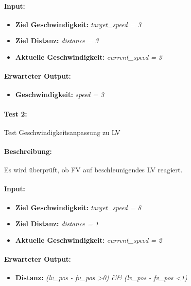 \documentclass[a4paper, 12pt, titlepage]{scrartcl}
\begin{document}
			\paragraph{Input:}
			\begin{itemize} \itemsep-0.5em
				\item \textbf{Ziel Geschwindigkeit:} \emph{target\_speed = 3}
				\item \textbf{Ziel Distanz:} \emph{distance = 3}
				\item \textbf{Aktuelle Geschwindigkeit:} \emph{current\_speed = 3}
			\end{itemize}
			\paragraph{Erwarteter Output:}
			\begin{itemize} \itemsep-0.5em
				\item \textbf{Geschwindigkeit:} \emph{speed = 3}
			\end{itemize}
			\paragraph{Test 2:}{Test Geschwindigkeitsanpassung zu LV}
			\paragraph{Beschreibung:} Es wird überprüft, ob FV auf beschleunigendes LV reagiert.
			\paragraph{Input:}
			\begin{itemize} \itemsep-0.5em
				\item \textbf{Ziel Geschwindigkeit:} \emph{target\_speed = 8}
				\item \textbf{Ziel Distanz:} \emph{distance = 1}
				\item \textbf{Aktuelle Geschwindigkeit:} \emph{current\_speed = 2}
			\end{itemize}
			\paragraph{Erwarteter Output:}
			\begin{itemize} \itemsep-0.5em
				\item \textbf{Distanz:} \emph{(lv\_pos - fv\_pos \textgreater 0) \&\& (lv\_pos - fv\_pos \textless 1)}
			\end{itemize} 			
			
\end{document}
